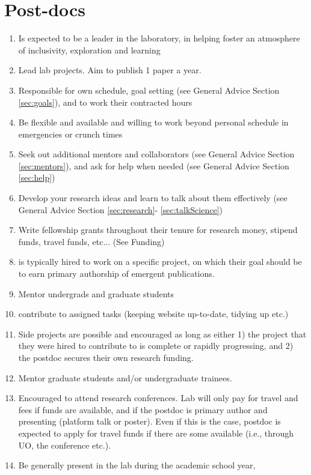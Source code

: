 \documentclass[12pt]{article}
\begin{document}
\section{Post-docs}
\begin{enumerate}
\item Is expected to be a leader in the laboratory, in helping foster
  an atmosphere of inclusivity, exploration and learning
 \item Lead lab projects. Aim to publish 1 paper a year.
\item  Responsible for own schedule, goal setting (see General
  Advice Section \ref{sec:goals}), and to work their contracted hours
\item Be flexible and available and willing to work beyond personal
  schedule in emergencies or crunch times
\item Seek out additional mentors and collaborators (see General
  Advice Section \ref{sec:mentors}), and ask for help when needed (see
  General Advice Section \ref{sec:help})
\item Develop your research ideas and learn to talk about them
  effectively (see General Advice Section \ref{sec:research}-
  \ref{sec:talkScience})
\item  Write fellowship grants throughout their tenure
  for research money, stipend funds, travel funds, etc... (See Funding)
\item is typically hired to work on a specific project, on which
  their goal should be to earn primary authorship of emergent
  publications.
\item Mentor undergrads and graduate students
\item contribute to assigned tasks (keeping website up-to-date,
  tidying up etc.)
\item Side projects are possible and encouraged as long as either 1)
  the project that they were hired to contribute to is complete or
  rapidly progressing, and 2) the postdoc secures their own research
  funding.
\item Mentor graduate students and/or undergraduate trainees.
\item Encouraged to attend research conferences. Lab will only pay
  for travel and fees if funds are available, and if the postdoc is
  primary author and presenting (platform talk or poster). Even if
  this is the case, postdoc is expected to apply for travel funds if
  there are some available (i.e., through UO, the conference etc.).
\item Be generally present in the lab during the academic school year,

\end{enumerate}
\end{document}
